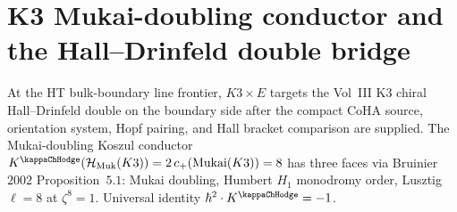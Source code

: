 \section{K3 Mukai-doubling conductor and the Hall--Drinfeld double bridge}
\label{sec:htbb-frontier-supplement}

\begin{remark}
\label{rem:htbb-frontier-K3}
At the HT bulk-boundary line frontier, $K3 \times E$ targets the
Vol~III K3 chiral Hall--Drinfeld double on the boundary side after
the compact CoHA source, orientation system, Hopf pairing, and Hall
bracket comparison are supplied. The Mukai-doubling Koszul conductor
$K^{\kappaChHodge}(\mathcal{H}_{\mathrm{Muk}}(K3))
=2\,c_+(\mathrm{Mukai}(K3))=8$ has three faces via Bruinier $2002$
Proposition~$5.1$: Mukai doubling, Humbert $H_1$ monodromy order,
Lusztig $\ell=8$ at $\zeta^8=1$. Universal identity
$\hbar^2\cdot K^{\kappaChHodge}=-1$.
\end{remark}
